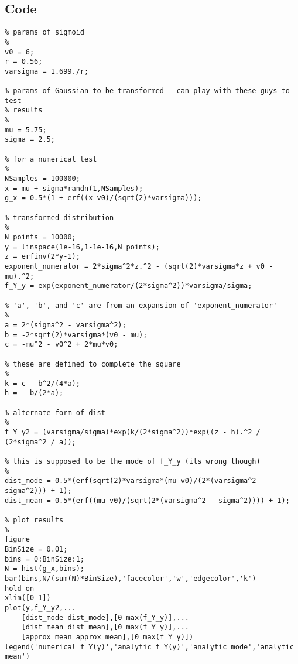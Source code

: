 \documentclass{article}
\begin{document}
%
\subsection*{Code}
\begin{verbatim} 
% params of sigmoid
%
v0 = 6;
r = 0.56;
varsigma = 1.699./r;

% params of Gaussian to be transformed - can play with these guys to test
% results
%
mu = 5.75;      
sigma = 2.5;

% for a numerical test
%
NSamples = 100000;
x = mu + sigma*randn(1,NSamples);
g_x = 0.5*(1 + erf((x-v0)/(sqrt(2)*varsigma)));

% transformed distribution
%
N_points = 10000;
y = linspace(1e-16,1-1e-16,N_points);
z = erfinv(2*y-1);
exponent_numerator = 2*sigma^2*z.^2 - (sqrt(2)*varsigma*z + v0 - mu).^2;
f_Y_y = exp(exponent_numerator/(2*sigma^2))*varsigma/sigma;

% 'a', 'b', and 'c' are from an expansion of 'exponent_numerator'
%
a = 2*(sigma^2 - varsigma^2);
b = -2*sqrt(2)*varsigma*(v0 - mu);
c = -mu^2 - v0^2 + 2*mu*v0;

% these are defined to complete the square
% 
k = c - b^2/(4*a);
h = - b/(2*a);

% alternate form of dist
%
f_Y_y2 = (varsigma/sigma)*exp(k/(2*sigma^2))*exp((z - h).^2 / (2*sigma^2 / a));

% this is supposed to be the mode of f_Y_y (its wrong though)
%
dist_mode = 0.5*(erf(sqrt(2)*varsigma*(mu-v0)/(2*(varsigma^2 - sigma^2))) + 1);
dist_mean = 0.5*(erf((mu-v0)/(sqrt(2*(varsigma^2 - sigma^2)))) + 1);

% plot results
%
figure
BinSize = 0.01;
bins = 0:BinSize:1;
N = hist(g_x,bins);
bar(bins,N/(sum(N)*BinSize),'facecolor','w','edgecolor','k')
hold on
xlim([0 1])
plot(y,f_Y_y2,...
    [dist_mode dist_mode],[0 max(f_Y_y)],...
    [dist_mean dist_mean],[0 max(f_Y_y)],...
    [approx_mean approx_mean],[0 max(f_Y_y)])
legend('numerical f_Y(y)','analytic f_Y(y)','analytic mode','analytic mean')
\end{verbatim}

\small


\end{document}

